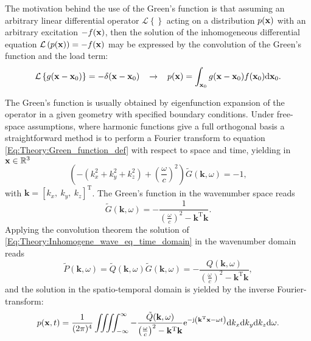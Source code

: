 The motivation behind the use of the Green's function is that assuming an arbitrary linear differential operator $\mathcal{L}\left\{ \right\}$ acting on a distribution $p(\mathbf{x})$ with an arbitrary excitation $-f(\mathbf{x})$, then the solution of the inhomogeneous differential equation $\mathcal{L}\left(p(\mathbf{x})\right) = -f(\mathbf{x})$ may be expressed by the convolution of the Green's function and the load term:
\begin{equation}
\mathcal{L}\left\{ g(\mathbf{x}-\mathbf{x}_0) \right\} = -\delta( \mathbf{x}-\mathbf{x}_0 ) \hspace{3mm} \rightarrow \hspace{3mm}
p(\mathbf{x}) = \int_{\mathbf{x}_0 }  g(\mathbf{x}-\mathbf{x}_0) f(\mathbf{x}_0) \mathrm{d} \mathbf{x}_0.
\label{Eq:Theory:Basic_Green_function_eq}
\end{equation}

The Green's function is usually obtained by eigenfunction expansion of the operator in a given geometry with specified boundary conditions. Under free-space assumptions, where harmonic functions give a full orthogonal basis a straightforward method is to perform a Fourier transform to equation \eqref{Eq:Theory:Green_function_def} with respect to space and time, yielding in $\mathbf{x} \in \mathbb{R}^{3}$
\begin{equation}
(-(k_x^2 + k_y^2 + k_z^2) + \left(\frac{\omega}{c} \right)^2)\tilde{G}(\mathbf{k},\omega) = -1,
\end{equation}
with $\mathbf{k} = [k_x,\ k_y,\ k_z]^{\mathrm{T}}$.
The Green's function in the wavenumber space reads \cite{Devaney2012, Watanabe2015}
\begin{equation}
\tilde{G}(\mathbf{k},\omega) = -\frac{1}{\left( \frac{\omega}{c}\right)^2 - \mathbf{k}^{\mathrm{T}} \mathbf{k}}.
\label{Eq:Theory:3D_kxkykzw_Green}
\end{equation}
Applying the convolution theorem the solution of \eqref{Eq:Theory:Inhomogene_wave_eq_time_domain} in the wavenumber domain reads
\begin{equation}
\tilde{P}(\mathbf{k},\omega)  = \tilde{Q}(\mathbf{k},\omega) \tilde{G}(\mathbf{k},\omega) = -\frac{Q	(\mathbf{k},\omega)}{\left( \frac{\omega}{c}\right)^2 -  \mathbf{k}^{\mathrm{T}} \mathbf{k} },
\end{equation}
and the solution in the spatio-temporal domain is yielded by the inverse Fourier-transform:
\begin{equation}
p(\mathbf{x},t) =\frac{1}{(2\pi)^4} \iiiint^{\infty}_{-\infty} - \frac{\tilde{Q}(\mathbf{k},\omega)}{\left( \frac{\omega}{c}\right)^2 -  \mathbf{k}^{\mathrm{T}} \mathbf{k} } \mathrm{e}^{-\mathrm{j} \left( \mathbf{k}^{\mathrm{T}}\mathbf{x} - \omega t \right) } \mathrm{d} k_x \mathrm{d} k_y \mathrm{d} k_z \mathrm{d} \omega.
\end{equation}


